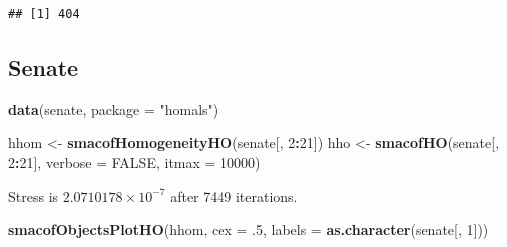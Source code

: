 \documentclass[
  12pt,
]{article}
\newenvironment{Shaded}{\begin{snugshade}}{\end{snugshade}}
\newcommand{\AttributeTok}[1]{\textcolor[rgb]{0.13,0.29,0.53}{#1}}
\newcommand{\ConstantTok}[1]{\textcolor[rgb]{0.56,0.35,0.01}{#1}}
\newcommand{\DecValTok}[1]{\textcolor[rgb]{0.00,0.00,0.81}{#1}}
\newcommand{\FunctionTok}[1]{\textcolor[rgb]{0.13,0.29,0.53}{\textbf{#1}}}
\newcommand{\NormalTok}[1]{#1}
\newcommand{\OtherTok}[1]{\textcolor[rgb]{0.56,0.35,0.01}{#1}}
\newcommand{\SpecialCharTok}[1]{\textcolor[rgb]{0.81,0.36,0.00}{\textbf{#1}}}
\newcommand{\StringTok}[1]{\textcolor[rgb]{0.31,0.60,0.02}{#1}}
\begin{document}
\begin{verbatim}
## [1] 404
\end{verbatim}

\subsection{Senate}\label{senate}

\begin{Shaded}
\begin{Highlighting}[]
\FunctionTok{data}\NormalTok{(senate, }\AttributeTok{package =} \StringTok{"homals"}\NormalTok{)}
\end{Highlighting}
\end{Shaded}

\begin{Shaded}
\begin{Highlighting}[]
\NormalTok{hhom }\OtherTok{\textless{}{-}} \FunctionTok{smacofHomogeneityHO}\NormalTok{(senate[, }\DecValTok{2}\SpecialCharTok{:}\DecValTok{21}\NormalTok{])}
\NormalTok{hho }\OtherTok{\textless{}{-}} \FunctionTok{smacofHO}\NormalTok{(senate[, }\DecValTok{2}\SpecialCharTok{:}\DecValTok{21}\NormalTok{], }\AttributeTok{verbose =} \ConstantTok{FALSE}\NormalTok{, }\AttributeTok{itmax =} \DecValTok{10000}\NormalTok{)}
\end{Highlighting}
\end{Shaded}

Stress is \ensuremath{2.0710178\times 10^{-7}} after 7449 iterations.

\begin{Shaded}
\begin{Highlighting}[]
\FunctionTok{smacofObjectsPlotHO}\NormalTok{(hhom, }\AttributeTok{cex =}\NormalTok{ .}\DecValTok{5}\NormalTok{, }\AttributeTok{labels =} \FunctionTok{as.character}\NormalTok{(senate[, }\DecValTok{1}\NormalTok{]))}
\end{Highlighting}
\end{Shaded}
\end{document}
